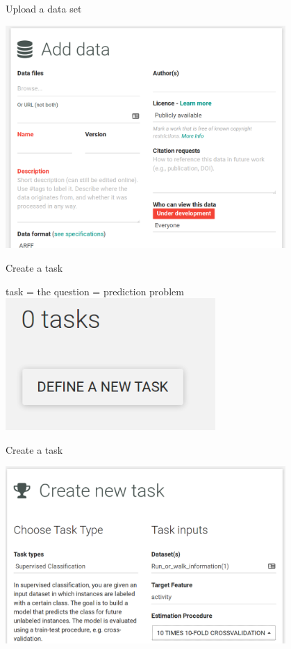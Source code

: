 \documentclass{beamer}
\begin{document}
\begin{frame}[fragile]{Upload a data set}
\begin{center}
\includegraphics[width = 0.8\textwidth]{add_data}
\end{center}
\end{frame}

\begin{frame}[fragile]{Create a task}
\begin{center}
task = the question = prediction problem\\[2em]
\includegraphics[width = 0.6\textwidth]{add_task}
\end{center}
\end{frame}


\begin{frame}[fragile]{Create a task}
\begin{center}
\includegraphics[width = 0.8\textwidth]{add_task2}
\end{center}
\end{frame}
\end{document}
